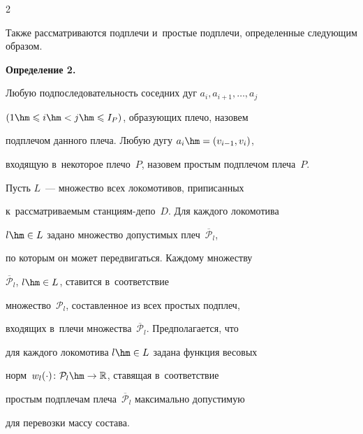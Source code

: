 \begin{multicols}{2}
\begin{enumerate}[(1)]
    


    \end{enumerate}





Также рассматриваются подплечи и~простые подплечи, определенные следующим образом.


    


\smallskip





\noindent


\textbf{Определение 2.}\


  Любую подпоследовательность соседних дуг $a_i, a_{i+1},\ldots, a_j$ 


   $(1\hm\leqslant i\hm<j \hm\leqslant I_P)$, образующих плечо, назовем 


   подплечом данного плеча. Любую дугу $a_i\hm=(v_{i-1},v_i)$, 


   входящую в~некоторое плечо~$P$, назовем простым подплечом плеча~$P$.


    


\smallskip





Пусть $L$~--- множество всех локомотивов, приписанных 


к~рассматриваемым стан\-ци\-ям-де\-по~$D$. Для каждого локомотива 


$l\hm\in L$ задано множество допустимых плеч~$\overline {\mathcal P}_l$, 


по которым он может передвигаться. Каждому множеству  


$\overline {\mathcal P}_l$, $l\hm\in L$, ставится в~соответствие 


множество~$\mathcal P_l$, составленное из всех простых подплеч, 


входящих в~плечи множества~$\overline {\mathcal P}_l$. Предполагается, что 


для каждого локомотива $l\hm\in L$ задана функция весовых 


норм~$w_l (\cdot) \colon {\mathcal P}_l \hm\to \mathbb{R}$, ставящая в~соответствие 


простым подплечам плеча~$\overline {\mathcal P}_l$ максимально допустимую 


для перевозки массу состава.






\end{multicols}
